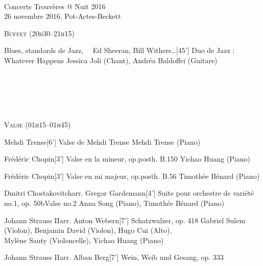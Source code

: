 \documentclass[a4paper,11pt,poets,durations]{ConcProg}
\begin{document}
{
\selectfont

~\\

\begin{programme}{
    Concerts Trouvères @ Nuit 2016
\\  {\normalsize 26 novembre 2016, Pot-Actes-Beckett}
}
~\\
\begin{center}
\textsc{Buffet (20h30--21h15)}
\end{center}
  \begin{part}[]
    \begin{composition}{Blues, standards de Jazz, ~~Ed Sheeran, Bill Withers\dots}{}{[45'] Duo de Jazz : Whatever Happens}{}
      {\small Jessica Joli (Chant), Andréa Baldoffei (Guitare)}
    \end{composition}\\
~\\
~\\
~\\
\begin{center}
\textsc{Valse (01h15--01h45)}
\end{center}
    \begin{composition}{Mehdi Trense}{}{[6'] Valse de Mehdi Trense}{}
      {\small Mehdi Trense (Piano)}
    \end{composition}
    \begin{composition}{Frédéric Chopin}{}{[3'] Valse en la mineur, op.posth. B.150}{}
      {\small Yichao Huang (Piano)}
    \end{composition}
    \begin{composition}{Frédéric Chopin}{}{[3'] Valse en mi majeur, op.posth. B.56}{}
      {\small Timothée Bénard (Piano)}
    \end{composition}
    \begin{composition}{Dmitri Chostakovitch}{arr. Gregor Gardemann}{[4'] Suite pour orchestre de variété no.1, op. 50b}{Valse no.2}
      {\small Anna Song (Piano), Timothée Bénard (Piano)}
    \end{composition}
    \begin{composition}{Johann Strauss II}{arr. Anton Webern}{[7'] Schatzwalzer, op. 418}{}
      {\small Gabriel Sulem (Violon), Benjamin David (Violon), Hugo Cui (Alto),\\Mylène Sauty (Violoncelle), Yichao Huang (Piano)}
    \end{composition}
    \begin{composition}{Johann Strauss II}{arr. Alban Berg}{[7'] Wein, Weib und Gesang, op. 333}{}

\end{composition}
\end{part}
\end{programme}}
\end{document}
